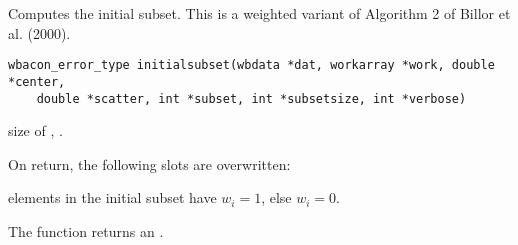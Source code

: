 \documentclass[a4paper,oneside,10pt,DIV=12]{scrreprt}
\begin{document}
\begin{Description}
Computes the initial subset. This is a weighted variant of Algorithm 2 of Billor
et al. (2000). 
\end{Description}
\begin{Usage}
\begin{verbatim}
wbacon_error_type initialsubset(wbdata *dat, workarray *work, double *center,
    double *scatter, int *subset, int *subsetsize, int *verbose)
\end{verbatim}
\end{Usage}
\begin{Arguments}
	\begin{ldescription}
		\WBDATA
		\WORKwb
		\CENTER
		\SCATTER
		\SUBSET{}
		\item[\code{subsetsize}] size of , \code{[int]}.
		\VERBOSE
	\end{ldescription}
\end{Arguments}
\begin{Value}
\begin{description}
On return, the following slots are overwritten:
	\item[\code{\LinkA{wbacon\_error\_type}{wbaconerrortype}}.]
	\item[\code{dat->w}] elements in the initial subset have $w_i=1$, else $w_i=0$.
	\item[\code{subset}.]
	\item[\code{subsetsize}.]
\end{description}
The function returns an .
\end{Value}
\end{document}
